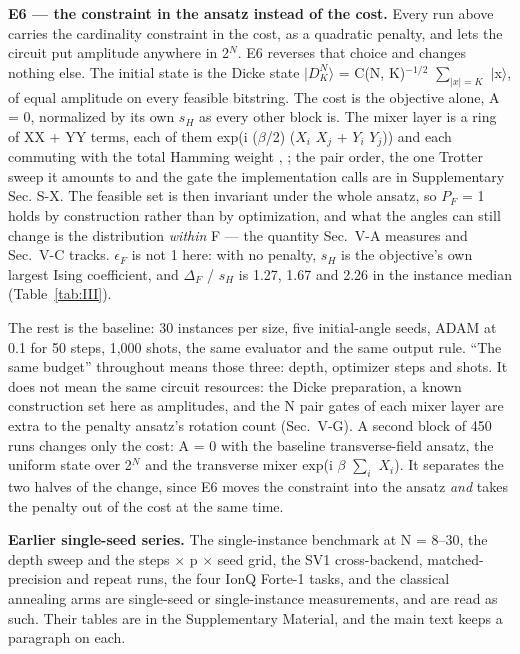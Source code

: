 \documentclass{ieeeaccess}
\begin{document}
\textbf{E6 --- the constraint in the ansatz instead of the cost.} Every run above carries the cardinality constraint in the cost, as a quadratic penalty, and lets the circuit put amplitude anywhere in 2$^{N}$. E6 reverses that choice and changes nothing else. The initial state is the Dicke state $|$$D^{N}_{K}$$\rangle$ = C(N, K)$^{-1/2}$ $\sum_{|x| = K}$ $|$x$\rangle$, of equal amplitude on every feasible bitstring. The cost is the objective alone, A = 0, normalized by its own $s_{H}$ as every other block is. The mixer layer is a ring of XX + YY terms, each of them exp(i ($\beta$/2) ($X_{i}$ $X_{j}$ + $Y_{i}$ $Y_{j}$)) and each commuting with the total Hamming weight \cite{ref11}, \cite{ref12}; the pair order, the one Trotter sweep it amounts to and the gate the implementation calls are in Supplementary Sec. S-X. The feasible set is then invariant under the whole ansatz, so $P_{F}$ = 1 holds by construction rather than by optimization, and what the angles can still change is the distribution \textit{within} F --- the quantity Sec.~V-A measures and Sec.~V-C tracks. $\epsilon_{F}$ is not 1 here: with no penalty, $s_{H}$ is the objective's own largest Ising coefficient, and $\Delta_{F}$ / $s_{H}$ is 1.27, 1.67 and 2.26 in the instance median (Table~\ref{tab:III}).


The rest is the baseline: 30 instances per size, five initial-angle seeds, ADAM at 0.1 for 50 steps, 1,000 shots, the same evaluator and the same output rule. ``The same budget'' throughout means those three: depth, optimizer steps and shots. It does not mean the same circuit resources: the Dicke preparation, a known construction \cite{ref48} set here as amplitudes, and the N pair gates of each mixer layer are extra to the penalty ansatz's rotation count (Sec.~V-G). A second block of 450 runs changes only the cost: A = 0 with the baseline transverse-field ansatz, the uniform state over 2$^{N}$ and the transverse mixer exp(i $\beta$ $\sum_{i}$ $X_{i}$). It separates the two halves of the change, since E6 moves the constraint into the ansatz \textit{and} takes the penalty out of the cost at the same time.


\textbf{Earlier single-seed series.} The single-instance benchmark at N = 8--30, the depth sweep and the steps $\times$ p $\times$ seed grid, the SV1 cross-backend, matched-precision and repeat runs, the four IonQ Forte-1 tasks, and the classical annealing arms are single-seed or single-instance measurements, and are read as such. Their tables are in the Supplementary Material, and the main text keeps a paragraph on each.
\end{document}
